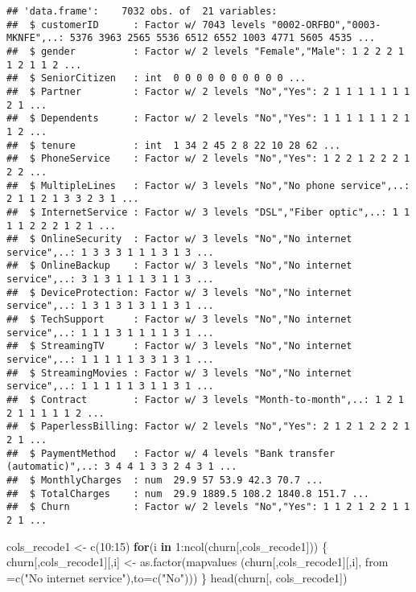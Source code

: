 \documentclass[
]{article}
\newenvironment{Shaded}{\begin{snugshade}}{\end{snugshade}}
\newcommand{\AttributeTok}[1]{\textcolor[rgb]{0.77,0.63,0.00}{#1}}
\newcommand{\ControlFlowTok}[1]{\textcolor[rgb]{0.13,0.29,0.53}{\textbf{#1}}}
\newcommand{\DecValTok}[1]{\textcolor[rgb]{0.00,0.00,0.81}{#1}}
\newcommand{\FunctionTok}[1]{\textcolor[rgb]{0.00,0.00,0.00}{#1}}
\newcommand{\NormalTok}[1]{#1}
\newcommand{\OtherTok}[1]{\textcolor[rgb]{0.56,0.35,0.01}{#1}}
\newcommand{\SpecialCharTok}[1]{\textcolor[rgb]{0.00,0.00,0.00}{#1}}
\newcommand{\StringTok}[1]{\textcolor[rgb]{0.31,0.60,0.02}{#1}}
\begin{document}
\begin{verbatim}
## 'data.frame':    7032 obs. of  21 variables:
##  $ customerID      : Factor w/ 7043 levels "0002-ORFBO","0003-MKNFE",..: 5376 3963 2565 5536 6512 6552 1003 4771 5605 4535 ...
##  $ gender          : Factor w/ 2 levels "Female","Male": 1 2 2 2 1 1 2 1 1 2 ...
##  $ SeniorCitizen   : int  0 0 0 0 0 0 0 0 0 0 ...
##  $ Partner         : Factor w/ 2 levels "No","Yes": 2 1 1 1 1 1 1 1 2 1 ...
##  $ Dependents      : Factor w/ 2 levels "No","Yes": 1 1 1 1 1 1 2 1 1 2 ...
##  $ tenure          : int  1 34 2 45 2 8 22 10 28 62 ...
##  $ PhoneService    : Factor w/ 2 levels "No","Yes": 1 2 2 1 2 2 2 1 2 2 ...
##  $ MultipleLines   : Factor w/ 3 levels "No","No phone service",..: 2 1 1 2 1 3 3 2 3 1 ...
##  $ InternetService : Factor w/ 3 levels "DSL","Fiber optic",..: 1 1 1 1 2 2 2 1 2 1 ...
##  $ OnlineSecurity  : Factor w/ 3 levels "No","No internet service",..: 1 3 3 3 1 1 1 3 1 3 ...
##  $ OnlineBackup    : Factor w/ 3 levels "No","No internet service",..: 3 1 3 1 1 1 3 1 1 3 ...
##  $ DeviceProtection: Factor w/ 3 levels "No","No internet service",..: 1 3 1 3 1 3 1 1 3 1 ...
##  $ TechSupport     : Factor w/ 3 levels "No","No internet service",..: 1 1 1 3 1 1 1 1 3 1 ...
##  $ StreamingTV     : Factor w/ 3 levels "No","No internet service",..: 1 1 1 1 1 3 3 1 3 1 ...
##  $ StreamingMovies : Factor w/ 3 levels "No","No internet service",..: 1 1 1 1 1 3 1 1 3 1 ...
##  $ Contract        : Factor w/ 3 levels "Month-to-month",..: 1 2 1 2 1 1 1 1 1 2 ...
##  $ PaperlessBilling: Factor w/ 2 levels "No","Yes": 2 1 2 1 2 2 2 1 2 1 ...
##  $ PaymentMethod   : Factor w/ 4 levels "Bank transfer (automatic)",..: 3 4 4 1 3 3 2 4 3 1 ...
##  $ MonthlyCharges  : num  29.9 57 53.9 42.3 70.7 ...
##  $ TotalCharges    : num  29.9 1889.5 108.2 1840.8 151.7 ...
##  $ Churn           : Factor w/ 2 levels "No","Yes": 1 1 2 1 2 2 1 1 2 1 ...
\end{verbatim}

\begin{Shaded}
\begin{Highlighting}[]
\NormalTok{cols\_recode1 }\OtherTok{\textless{}{-}} \FunctionTok{c}\NormalTok{(}\DecValTok{10}\SpecialCharTok{:}\DecValTok{15}\NormalTok{)}
\ControlFlowTok{for}\NormalTok{(i }\ControlFlowTok{in} \DecValTok{1}\SpecialCharTok{:}\FunctionTok{ncol}\NormalTok{(churn[,cols\_recode1])) \{}
\NormalTok{  churn[,cols\_recode1][,i] }\OtherTok{\textless{}{-}} \FunctionTok{as.factor}\NormalTok{(mapvalues}
\NormalTok{                                        (churn[,cols\_recode1][,i], }\AttributeTok{from =}\FunctionTok{c}\NormalTok{(}\StringTok{"No internet service"}\NormalTok{),}\AttributeTok{to=}\FunctionTok{c}\NormalTok{(}\StringTok{"No"}\NormalTok{)))}
\NormalTok{\}}
\FunctionTok{head}\NormalTok{(churn[, cols\_recode1])}
\end{Highlighting}
\end{Shaded}
\end{document}
